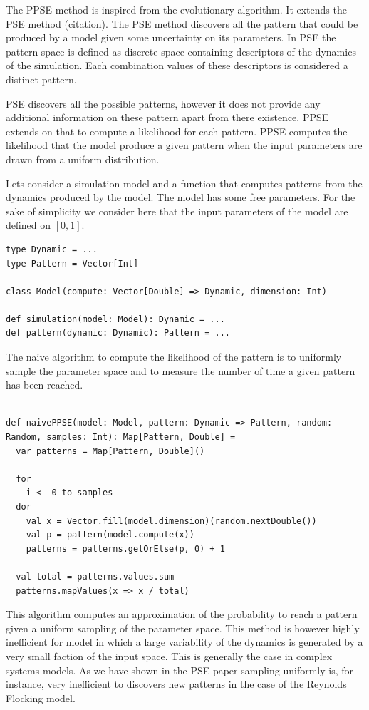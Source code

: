 \documentclass[10pt,letterpaper]{article}
\theoremstyle{definition}
\theoremstyle{remark}
\begin{document}
The PPSE method is inspired from the evolutionary algorithm. It extends the PSE method (citation). The PSE method discovers all the pattern that could be produced by a model given some uncertainty on its parameters. In PSE the pattern space is defined as discrete space containing descriptors of the dynamics of the simulation. Each combination values of these descriptors is considered a distinct pattern.

PSE discovers all the possible patterns, however it does not provide any additional information on these pattern apart from there existence. PPSE extends on that to compute a likelihood for each pattern. PPSE computes the likelihood that the model produce a given pattern when the input parameters are drawn from a uniform distribution.

Lets consider a simulation model and a function that computes patterns from the dynamics produced by the model. The model has some free parameters. For the sake of simplicity we consider here that the input parameters of the model are defined on $[0, 1]$.

\begin{lstlisting}[caption={Model and pattern signatures},label={lst:pattern}]
type Dynamic = ...
type Pattern = Vector[Int]

class Model(compute: Vector[Double] => Dynamic, dimension: Int)

def simulation(model: Model): Dynamic = ...
def pattern(dynamic: Dynamic): Pattern = ...
\end{lstlisting}

The naive algorithm to compute the likelihood of the pattern is to uniformly sample the parameter space and to measure the number of time a given pattern has been reached. 

\begin{lstlisting}[caption={Naive PPSE},label={lst:naivePPSE}]

def naivePPSE(model: Model, pattern: Dynamic => Pattern, random: Random, samples: Int): Map[Pattern, Double] = 
  var patterns = Map[Pattern, Double]()
  
  for 
    i <- 0 to samples
  dor
    val x = Vector.fill(model.dimension)(random.nextDouble())
    val p = pattern(model.compute(x))
    patterns = patterns.getOrElse(p, 0) + 1
  
  val total = patterns.values.sum
  patterns.mapValues(x => x / total)
\end{lstlisting}

This algorithm computes an approximation of the probability to reach a pattern given a uniform sampling of the parameter space. This method is however highly inefficient for model in which a large variability of the dynamics is generated by a very small faction of the input space. This is generally the case in complex systems models. As we have shown in the PSE paper sampling uniformly is, for instance, very inefficient to discovers new patterns in the case of the Reynolds Flocking model.
\end{document}
